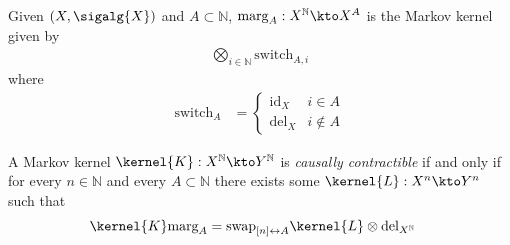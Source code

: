 \begin{definition}
Given $(X,\sigalg{X})$ and $A\subset\mathbb{N}$, $\mathrm{marg}_A:X^\mathbb{N}\kto X^A$ is the Markov kernel given by
\begin{align}
    \bigotimes_{i\in \mathbb{N}} \text{switch}_{A,i}
\end{align}
where
\begin{align}
    \text{switch}_A &= \begin{cases}
                        \text{id}_X&i\in A\\
                        \text{del}_X&i\not\in A
                        \end{cases}
\end{align} 
\end{definition}

\begin{theorem}\label{th:equal_of_condits_k}
A Markov kernel $\kernel{K}:X^{\mathbb{N}}\kto Y^{\mathbb{N}}$ is \emph{causally contractible} if and only if for every $n\in \mathbb{N}$ and every $A\subset\mathbb{N}$ there exists some $\kernel{L}:X^n\kto Y^n$ such that
\begin{align}
    \kernel{K} \text{marg}_A &= \text{swap}_{[n]\leftrightarrow A} \kernel{L}\otimes \text{del}_{X^{\mathbb{N}}}
\end{align}
\end{theorem}

